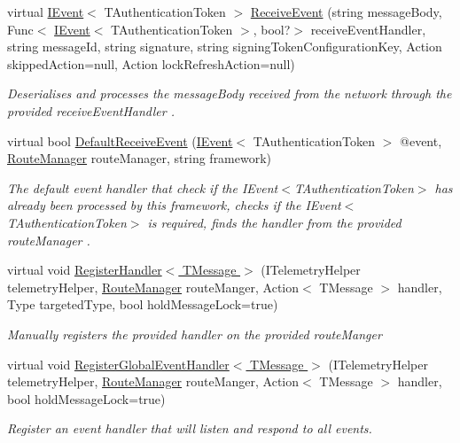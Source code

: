 \begin{DoxyCompactItemize}
virtual \hyperlink{interfaceCqrs_1_1Events_1_1IEvent}{I\+Event}$<$ T\+Authentication\+Token $>$ \hyperlink{classCqrs_1_1Azure_1_1ServiceBus_1_1AzureBusHelper_ab1feda11b64b606f36d517ce5ce8ca59_ab1feda11b64b606f36d517ce5ce8ca59}{Receive\+Event} (string message\+Body, Func$<$ \hyperlink{interfaceCqrs_1_1Events_1_1IEvent}{I\+Event}$<$ T\+Authentication\+Token $>$, bool?$>$ receive\+Event\+Handler, string message\+Id, string signature, string signing\+Token\+Configuration\+Key, Action skipped\+Action=null, Action lock\+Refresh\+Action=null)
\begin{DoxyCompactList}\small\item\em Deserialises and processes the {\itshape message\+Body}  received from the network through the provided {\itshape receive\+Event\+Handler} . \end{DoxyCompactList}\item 
virtual bool \hyperlink{classCqrs_1_1Azure_1_1ServiceBus_1_1AzureBusHelper_a0139f99e393214427b9a711bf27cae40_a0139f99e393214427b9a711bf27cae40}{Default\+Receive\+Event} (\hyperlink{interfaceCqrs_1_1Events_1_1IEvent}{I\+Event}$<$ T\+Authentication\+Token $>$ @event, \hyperlink{classCqrs_1_1Bus_1_1RouteManager}{Route\+Manager} route\+Manager, string framework)
\begin{DoxyCompactList}\small\item\em The default event handler that check if the I\+Event$<$\+T\+Authentication\+Token$>$ has already been processed by this framework, checks if the I\+Event$<$\+T\+Authentication\+Token$>$ is required, finds the handler from the provided {\itshape route\+Manager} . \end{DoxyCompactList}\item 
virtual void \hyperlink{classCqrs_1_1Azure_1_1ServiceBus_1_1AzureBusHelper_a3b8dd8410756ffdc67782dde8f2519ff_a3b8dd8410756ffdc67782dde8f2519ff}{Register\+Handler$<$ T\+Message $>$} (I\+Telemetry\+Helper telemetry\+Helper, \hyperlink{classCqrs_1_1Bus_1_1RouteManager}{Route\+Manager} route\+Manger, Action$<$ T\+Message $>$ handler, Type targeted\+Type, bool hold\+Message\+Lock=true)
\begin{DoxyCompactList}\small\item\em Manually registers the provided {\itshape handler}  on the provided {\itshape route\+Manger}  \end{DoxyCompactList}\item 
virtual void \hyperlink{classCqrs_1_1Azure_1_1ServiceBus_1_1AzureBusHelper_ac1955fe076ac3ef09a2cad1121c36ba2_ac1955fe076ac3ef09a2cad1121c36ba2}{Register\+Global\+Event\+Handler$<$ T\+Message $>$} (I\+Telemetry\+Helper telemetry\+Helper, \hyperlink{classCqrs_1_1Bus_1_1RouteManager}{Route\+Manager} route\+Manger, Action$<$ T\+Message $>$ handler, bool hold\+Message\+Lock=true)
\begin{DoxyCompactList}\small\item\em Register an event handler that will listen and respond to all events. \end{DoxyCompactList}\end{DoxyCompactItemize}
